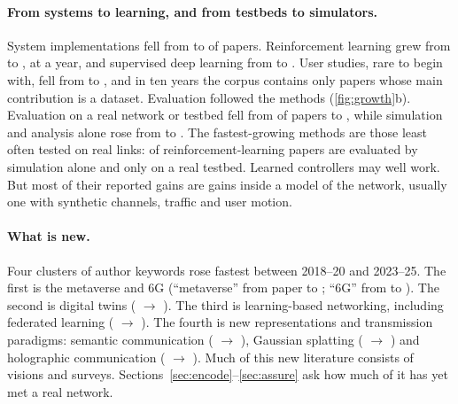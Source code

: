 \paragraph{From systems to learning, and from testbeds to simulators.} System implementations fell from
\nxrShMethSystemImplementationEarly{} to \nxrShMethSystemImplementationLate{} of papers. Reinforcement
learning grew from \nxrShMethReinforcementLearningEarly{} to \nxrShMethReinforcementLearningLate{}, at
\nxrCagrMethReinforcementLearning{} a year, and supervised deep learning from
\nxrShMethDeepLearningEarly{} to \nxrShMethDeepLearningLate{}. User studies, rare to begin with, fell from
\nxrShMethUserStudyEarly{} to \nxrShMethUserStudyLate{}, and in ten years the corpus contains only
\nxrNDatasets{} papers whose main contribution is a dataset. Evaluation followed the methods
(\cref{fig:growth}b). Evaluation on a real network or testbed fell from \nxrEvalRealEarly{} of papers to
\nxrEvalRealLate{}, while simulation and analysis alone rose from \nxrEvalSimAnaEarly{} to
\nxrEvalSimAnaLate{}. The fastest-growing methods are those least often tested on real links:
\nxrRLSimShare{} of reinforcement-learning papers are evaluated by simulation alone and only
\nxrRLRealShare{} on a real testbed. Learned controllers may well work. But most of their reported gains
are gains inside a model of the network, usually one with synthetic channels, traffic and user motion.

\paragraph{What is new.} Four clusters of author keywords rose fastest between 2018--20 and 2023--25. The
first is the metaverse and 6G (``metaverse'' from \nxrKwMetaverseEarly{} paper to \nxrKwMetaverseLate{};
``6G'' from \nxrKwSixGEarly{} to \nxrKwSixGLate{}). The second is digital twins (\nxrKwDigitalTwinEarly{}
$\to$ \nxrKwDigitalTwinLate{}). The third is learning-based networking, including federated learning
(\nxrKwFederatedLearningEarly{} $\to$ \nxrKwFederatedLearningLate{}). The fourth is new representations
and transmission paradigms: semantic communication (\nxrKwSemanticCommunicationEarly{} $\to$
\nxrKwSemanticCommunicationLate{}), Gaussian splatting (\nxrKwGaussianSplattingEarly{} $\to$
\nxrKwGaussianSplattingLate{}) and holographic communication (\nxrKwHolographicCommunicationEarly{} $\to$
\nxrKwHolographicCommunicationLate{}). Much of this new literature consists of visions and surveys.
Sections~\ref{sec:encode}--\ref{sec:assure} ask how much of it has yet met a real network.
